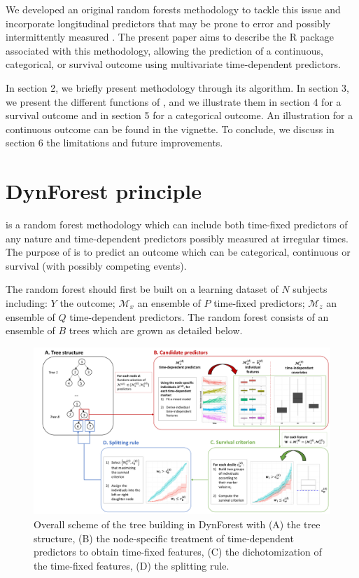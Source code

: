 We developed an original random forests methodology to tackle this issue and incorporate longitudinal predictors that may be prone to error and possibly intermittently measured \citep{devaux_random_2023}. The present paper aims to describe the  R package associated with this methodology, allowing the prediction of a continuous, categorical, or survival outcome using multivariate time-dependent predictors.

In section 2, we briefly present  methodology through its algorithm. In section 3, we present the different functions of , and we illustrate them in section 4 for a survival outcome and in section 5 for a categorical outcome. An illustration for a continuous outcome can be found in the  vignette. To conclude, we discuss in section 6 the limitations and future improvements.

\section{DynForest principle}\label{dynforest-principle}

 is a random forest methodology which can include both time-fixed predictors of any nature and time-dependent predictors possibly measured at irregular times. The purpose of  is to predict an outcome which can be categorical, continuous or survival (with possibly competing events).

The random forest should first be built on a learning dataset of \(N\) subjects including: \(Y\) the outcome; \(\mathcal{M}_x\) an ensemble of \(P\) time-fixed predictors; \(\mathcal{M}_z\) an ensemble of \(Q\) time-dependent predictors. The random forest consists of an ensemble of \(B\) trees which are grown as detailed below.

\begin{figure}

{\centering \includegraphics[width=1\linewidth,height=0.3\textheight]{figures/dynforestR_graph} 

}

\caption{Overall scheme of the tree building in DynForest with (A) the tree structure, (B) the node-specific treatment of time-dependent predictors to obtain time-fixed features, (C) the dichotomization of the time-fixed features, (D) the splitting rule.}\label{fig:dynforestRgraph}
\end{figure}


